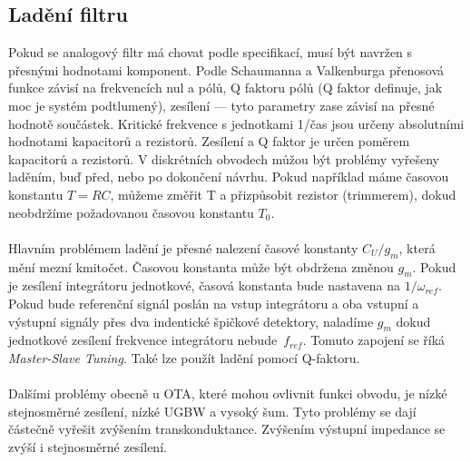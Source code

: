 \subsection{Ladění filtru}
\noindent Pokud se analogový filtr má chovat podle specifikací, musí být navržen s přesnými hodnotami komponent. Podle Schaumanna a Valkenburga \cite{13} přenosová funkce závisí na frekvencích nul a pólů, Q faktoru pólů (Q faktor definuje, jak moc je systém podtlumený), zesílení --- tyto parametry zase závisí na přesné hodnotě součástek. Kritické frekvence s jednotkami 1/čas jsou určeny absolutními hodnotami kapacitorů a rezistorů. Zesílení a Q faktor je určen poměrem kapacitorů a rezistorů. V diskrétních obvodech můžou být problémy vyřešeny laděním, buď před, nebo po dokončení návrhu. Pokud například máme časovou konstantu $T = RC$, můžeme změřit T a přizpůsobit rezistor (trimmerem), dokud neobdržíme požadovanou časovou konstantu $T_0$.\\
\\
Hlavním problémem ladění je přesné nalezení časové konstanty $C_U/g_m$, která mění mezní kmitočet. Časovou konstanta může být obdržena změnou $g_m$. Pokud je zesílení integrátoru jednotkové, časová konstanta bude nastavena na $1/\omega _{ref}$. Pokud bude referenční signál poslán na vstup integrátoru a oba vstupní a výstupní signály přes dva indentické špičkové detektory, naladíme $g_m$ dokud jednotkové zesílení frekvence integrátoru nebude~$f_{ref}$. Tomuto zapojení se říká \textit{Master-Slave Tuning}. Také lze použít ladění pomocí Q-faktoru. \\
\\
Dalšími problémy obecně u OTA, které mohou ovlivnit funkci obvodu, je nízké stejnosměrné zesílení, nízké UGBW a vysoký šum. Tyto problémy se dají částečně vyřešit zvýšením transkonduktance. Zvýšením výstupní impedance se zvýší i stejnosměrné zesílení.
